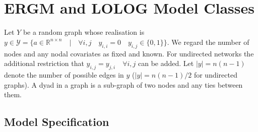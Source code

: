 \documentclass[
]{statsoc}
\begin{document}
\section{ERGM and LOLOG Model Classes}\label{sec:LOLOG}

Let \(Y\) be a random graph whose realisation is
\(y \in \mathscr{Y} = \lbrace a \in \mathbb{R}^{n \times n} \quad \vert \quad \forall i,j \quad y_{i,i} = 0 \quad y_{i,j} \in \lbrace 0,1 \rbrace\rbrace\).
We regard the number of nodes and any nodal covariates as fixed and
known. For undirected networks the additional restriction that
\(y_{i,j} = y_{j,i} \quad\forall i,j\) can be added. Let \(|y|=n(n-1)\)
denote the number of possible edges in \(y\) (\(|y|=n(n-1)/2\) for
undirected graphs). A dyad in a graph is a sub-graph of two nodes and
any ties between them.

\subsection{Model Specification}
\end{document}
